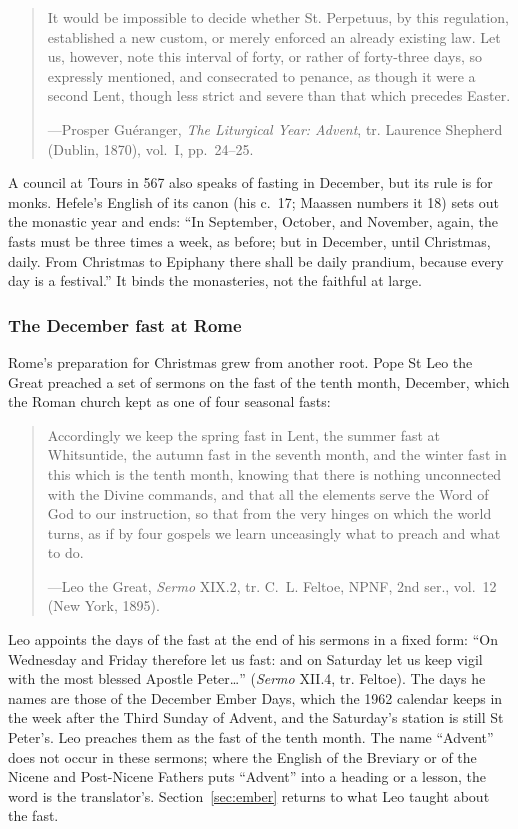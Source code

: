 \begin{quote}
It would be impossible to decide whether St. Perpetuus, by this regulation, established a new
custom, or merely enforced an already existing law. Let us, however, note this interval of forty,
or rather of forty-three days, so expressly mentioned, and consecrated to penance, as though it
were a second Lent, though less strict and severe than that which precedes Easter.\par
{\smallskip\noindent\small ---Prosper Guéranger, \textit{The Liturgical Year: Advent}, tr.
Laurence Shepherd (Dublin, 1870), vol.~I, pp.~24--25.\par}
\end{quote}

A council at Tours in 567 also speaks of fasting in December, but its rule is for monks.
Hefele's English of its canon (his c.~17; Maassen numbers it 18) sets out the monastic year and
ends: ``In September, October, and November, again, the fasts must be three times a week, as
before; but in December, until Christmas, daily. From Christmas to Epiphany there shall be daily
prandium, because every day is a festival.'' It binds the monasteries, not the faithful at large.

\subsubsection{The December fast at Rome}

Rome's preparation for Christmas grew from another root. Pope St Leo the Great preached a set of
sermons on the fast of the tenth month, December, which the Roman church kept as one of four
seasonal fasts:

\begin{quote}
Accordingly we keep the spring fast in Lent, the summer fast at Whitsuntide, the autumn fast in
the seventh month, and the winter fast in this which is the tenth month, knowing that there is
nothing unconnected with the Divine commands, and that all the elements serve the Word of God to
our instruction, so that from the very hinges on which the world turns, as if by four gospels we
learn unceasingly what to preach and what to do.\par
{\smallskip\noindent\small ---Leo the Great, \textit{Sermo} XIX.2, tr. C.~L. Feltoe, NPNF, 2nd
ser., vol.~12 (New York, 1895).\par}
\end{quote}

Leo appoints the days of the fast at the end of his sermons in a fixed form: ``On Wednesday and
Friday therefore let us fast: and on Saturday let us keep vigil with the most blessed Apostle
Peter\dots'' (\textit{Sermo} XII.4, tr. Feltoe). The days he names are those of the December Ember
Days, which the 1962 calendar keeps in the week after the Third Sunday of Advent, and the
Saturday's station is still St Peter's. Leo preaches them as the fast of the tenth month. The
name ``Advent'' does not occur in these sermons; where the English of the Breviary or of the
Nicene and Post-Nicene Fathers puts ``Advent'' into a heading or a lesson, the word is the
translator's. Section~\ref{sec:ember} returns to what Leo taught about the fast.

